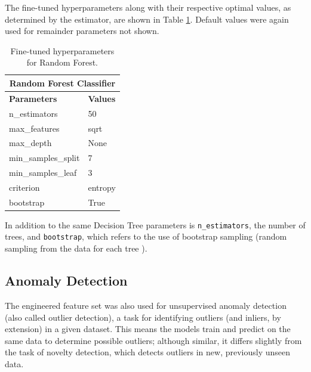 \documentclass[12pt,a4paper]{article}
\numberwithin{figure}{section}
\numberwithin{table}{section}
\numberwithin{definition}{section}
\begin{document}
The fine-tuned hyperparameters along with their respective optimal values, as determined by the estimator, are shown in Table \ref{tbl:randomforestparams}. Default values were again used for remainder parameters not shown.

\begin{table}[!h] 
  \centering\small
  \renewcommand{\arraystretch}{1.5} 
  \begin{tabular}{@{}ll@{}}
  \hline
  \multicolumn{2}{|c|}{\textbf{Random Forest Classifier}} \\
  \hline
  \textbf{Parameters} & \textbf{Values} \\
  \hline
  n\_estimators & 50 \\
  max\_features & sqrt \\
  max\_depth & None \\
  min\_samples\_split & 7 \\
  min\_samples\_leaf & 3 \\
  criterion & entropy \\
  bootstrap & True \\
  \hline
  \end{tabular}
  \caption{Fine-tuned hyperparameters for Random Forest.}
  \label{tbl:randomforestparams}
\end{table}

In addition to the same Decision Tree parameters is \texttt{n\_estimators}, the number of trees, and \texttt{bootstrap}, which refers to the use of bootstrap sampling (random sampling from the data for each tree \parencite{Oktafiani2024article}).


\subsection{Anomaly Detection}
\label{ssec:anomalydetection}

The engineered feature set was also used for unsupervised anomaly detection (also called outlier detection), a task for identifying outliers (and inliers, by extension) in a given dataset. This means the models train and predict on the same data to determine possible outliers; although similar, it differs slightly from the task of novelty detection, which detects outliers in new, previously unseen data. 
\end{document}
